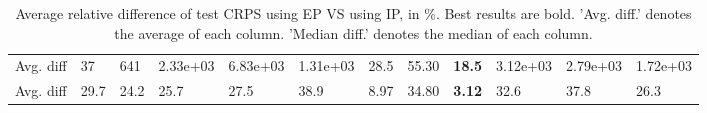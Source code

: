 \begin{table}[ht!]
\begin{tabular}{lllllllrllll}
   \hline
Avg. diff & 37 & 641 & 2.33e+03 & 6.83e+03 & 1.31e+03 & 28.5 & 55.30 & \textbf{18.5} & 3.12e+03 & 2.79e+03 & 1.72e+03 \\ 
  Avg. diff & 29.7 & 24.2 & 25.7 & 27.5 & 38.9 & 8.97 & 34.80 & \textbf{3.12} & 32.6 & 37.8 & 26.3 \\ 
   \hline
\hline
\end{tabular}
\endgroup
\caption{Average relative difference of test CRPS using EP VS using IP, in \%. 
                  Best results are bold. 
                  'Avg. diff.' denotes the average of each column.
                  'Median diff.' denotes the median of each column.} 
\label{TABLES/table_results_CRPS_gower_num_and_cat_features_EP_VS_IP}
\end{table}
